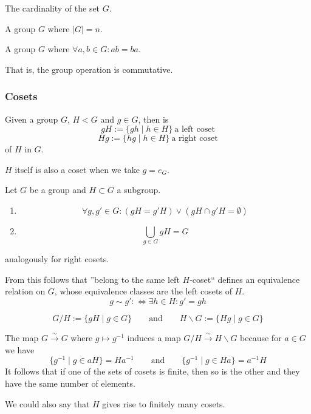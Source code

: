 \begin{definition}
   The cardinality of the set \(G\).
\end{definition}

\begin{definition}
   A group \(G\) where \(|G| = n\).
\end{definition}

\begin{definition}\label{def:abel_group}
   A group \(G\) where \(\forall a, b \in G: ab = ba\).
\end{definition}
\begin{remark}
   That is, the group operation is commutative.
\end{remark}

\subsubsection{Cosets}
\begin{definition}
   Given a group \(G\), \(H < G\) and \(g \in G\), then is
   \[gH := \{gh \mid h \in H\}~\text{a left coset}\]
   \[Hg := \{hg \mid h \in H\}~\text{a right coset}\]
   of \(H\) in \(G\).
\end{definition}
\begin{remark}
   \(H\) itself is also a coset when we take \(g = e_G\).
\end{remark}

\begin{proposition}
   Let \(G\) be a group and \(H \subset G\) a subgroup.
   \begin{enumerate}[label=\roman*, align=Center]
      \item \[\forall g, g' \in G: (gH = g'H) \lor (gH \cap g'H = \emptyset)\]
      \item \[\bigcup_{g \in G} gH = G\]
   \end{enumerate}
   analogously for right cosets.
\end{proposition}
\begin{remark}
   From this follows that ''belong to the same left \(H\)-coset`` defines an equivalence relation on \(G\), whose equivalence classes are the left cosets of \(H\).
\[g \sim g' :\iff \exists h \in H: g' = gh\]
\end{remark}

\begin{definition}
   \[G/H := \{gH \mid g \in G\} \qquad\text{and}\qquad H\backslash G := \{Hg \mid g \in G\}\]
\end{definition}
\begin{remark}
   The map \(G \xrightarrow{\sim} G\) where \(g \mapsto g^{-1}\) induces a map \(G/H \xrightarrow{\sim} H\backslash G\) because for \(a \in G\) we have
   \[\{g^{-1} \mid g \in aH\} = Ha^{-1} \qquad\text{and}\qquad \{g^{-1} \mid g \in Ha\} = a^{-1}H\]
   It follows that if one of the sets of cosets is finite, then so is the other and they have the same number of elements.

   We could also say that \(H\) gives rise to finitely many cosets.
\end{remark}

